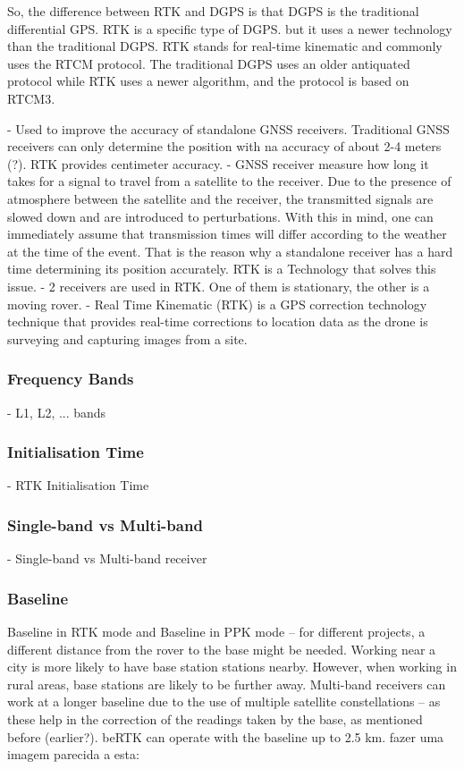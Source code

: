 So, the difference between RTK and DGPS is that DGPS is the traditional differential GPS.
RTK is a specific type of DGPS.
but it uses a newer technology than the traditional DGPS.
RTK stands for real-time kinematic and commonly uses the RTCM protocol.
The traditional DGPS uses an older antiquated protocol while RTK uses a newer algorithm, and the protocol is based on RTCM3. 

- Used to improve the accuracy of standalone GNSS receivers. Traditional GNSS receivers can only determine the position with na accuracy of about 2-4 meters (?). RTK provides centimeter accuracy.
- GNSS receiver measure how long it takes for a signal to travel from a satellite to the receiver. Due to the presence of atmosphere between the satellite and the receiver, the transmitted signals are slowed down and are introduced to perturbations. With this in mind, one can immediately assume that transmission times will differ according to the weather at the time of the event. That is the reason why a standalone receiver has a hard time determining its position accurately. RTK is a Technology that solves this issue.
- 2 receivers are used in RTK. One of them is stationary, the other is a moving rover.
- Real Time Kinematic (RTK) is a GPS correction technology technique that provides real-time corrections to location data as the drone is surveying and capturing images from a site.    


\subsubsection{Frequency Bands}\label{sec:II_gnssAug_rtk_freqbands}
- L1, L2, ... bands

\subsubsection{Initialisation Time}\label{sec:II_gnssAug_rtk_inittime}
- RTK Initialisation Time

\subsubsection{Single-band vs Multi-band}\label{sec:II_gnssAug_rtk_smband}
- Single-band vs Multi-band receiver

\subsubsection{Baseline}\label{sec:II_gnssAug_rtk_baseline}
Baseline in RTK mode and Baseline in PPK mode -- for different projects, a different distance from the rover to the base might be needed. Working near a city is more likely to have base station stations nearby. However, when working in rural areas, base stations are likely to be further away.
Multi-band receivers can work at a longer baseline due to the use of multiple satellite constellations -- as these help in the correction of the readings taken by the base, as mentioned before (earlier?). beRTK can operate with the baseline up to 2.5 km.
fazer uma imagem parecida a esta:

